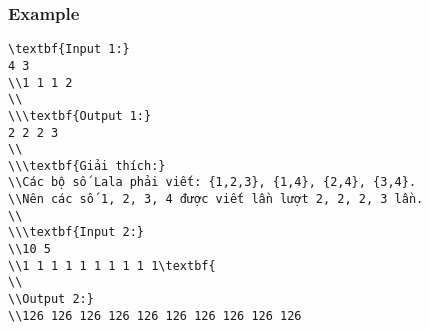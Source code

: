 \subsubsection{   Example  }
\begin{verbatim}
\textbf{Input 1:}
4 3
\\1 1 1 2
\\
\\\textbf{Output 1:}
2 2 2 3 
\\
\\\textbf{Giải thích:}
\\Các bộ số Lala phải viết: {1,2,3}, {1,4}, {2,4}, {3,4}. 
\\Nên các số 1, 2, 3, 4 được viết lần lượt 2, 2, 2, 3 lần.
\\
\\\textbf{Input 2:}
\\10 5
\\1 1 1 1 1 1 1 1 1 1\textbf{
\\
\\Output 2:}
\\126 126 126 126 126 126 126 126 126 126 \end{verbatim}